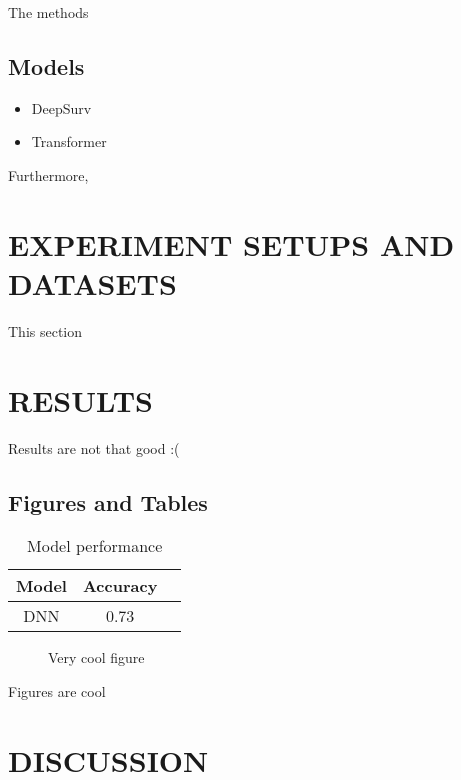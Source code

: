 \documentclass[letterpaper, 10 pt, conference]{ieeeconf}  %
\begin{document}
The methods

\subsection{Models}

\begin{itemize}

\item DeepSurv
\item Transformer

\end{itemize}

Furthermore, 


\section{EXPERIMENT SETUPS AND DATASETS}

This section

\section{RESULTS}

Results are not that good :(

\subsection{Figures and Tables}

\begin{table}[h]
\caption{Model performance}
\label{table_example}
\begin{center}
\begin{tabular}{|c|c|c|}
\hline
Model & Accuracy\\
\hline
DNN & 0.73\\
\hline
\end{tabular}
\end{center}
\end{table}


   \begin{figure}[thpb]
      \centering
      \caption{Very cool figure}
      \label{figurelabel}
   \end{figure}
   

Figures are cool

\section{DISCUSSION}
\end{document}
